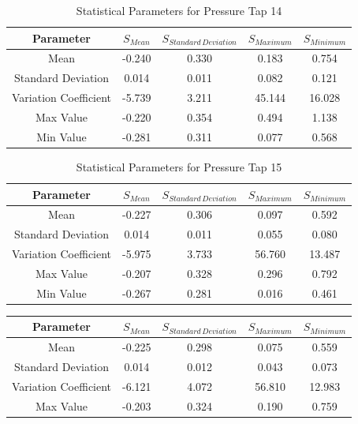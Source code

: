 \documentclass[11pt,a4paper,titlepage]{report}
\begin{document}
\begin{appendix}
\begin{table}[h]
    \label{tab:wind statistical parameters 13}
\end{table}
\begin{table}[h]
    \centering
    \begin{tabular}{c|c|c|c|c}
  Parameter   & $S_{Mean}$ & $S_{Standard\,Deviation}$ & $S_{Maximum}$ &	$S_{Minimum}$ \\
    \hline
  Mean                  & -0.240 & 0.330 & 0.183  & 0.754  \\
Standard Deviation    & 0.014  & 0.011 & 0.082  & 0.121  \\
Variation Coefficient & -5.739 & 3.211 & 45.144 & 16.028 \\
Max Value             & -0.220 & 0.354 & 0.494  & 1.138  \\
Min Value             & -0.281 & 0.311 & 0.077  & 0.568 
    \end{tabular}
    \caption{Statistical Parameters for Pressure Tap 14}
    \label{tab:wind statistical parameters 14}
\end{table}
\begin{table}[h]
    \centering
    \begin{tabular}{c|c|c|c|c}
   Parameter  & $S_{Mean}$ & $S_{Standard\,Deviation}$ & $S_{Maximum}$ &	$S_{Minimum}$ \\
    \hline
Mean                  & -0.227 & 0.306 & 0.097  & 0.592  \\
Standard Deviation    & 0.014  & 0.011 & 0.055  & 0.080  \\
Variation Coefficient & -5.975 & 3.733 & 56.760 & 13.487 \\
Max Value             & -0.207 & 0.328 & 0.296  & 0.792  \\
Min Value             & -0.267 & 0.281 & 0.016  & 0.461 
    \end{tabular}
    \caption{Statistical Parameters for Pressure Tap 15}
    \label{tab:wind statistical parameters 15}
\end{table}
\begin{table}[h]
    \centering
    \begin{tabular}{c|c|c|c|c}
    Parameter & $S_{Mean}$ & $S_{Standard\,Deviation}$ & $S_{Maximum}$ &	$S_{Minimum}$ \\
    \hline
  Mean                  & -0.225 & 0.298 & 0.075  & 0.559  \\
Standard Deviation    & 0.014  & 0.012 & 0.043  & 0.073  \\
Variation Coefficient & -6.121 & 4.072 & 56.810 & 12.983 \\
Max Value             & -0.203 & 0.324 & 0.190  & 0.759  \\

\end{tabular}
\end{table}
\end{appendix}
\end{document}
